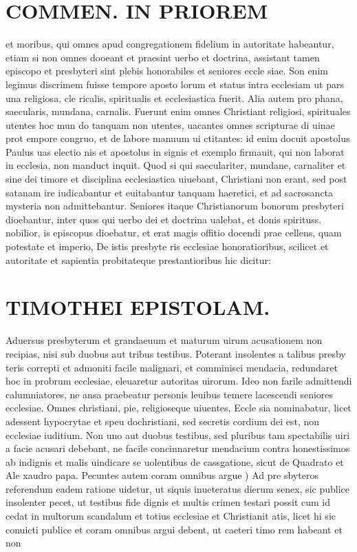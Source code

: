 \documentclass{article}
\begin{document}
\begin{pages}
\section*{COMMEN. IN PRIOREM }
\marginpar{[ p.142 ]}\pstart et moribus, qui omnes apud congregationem fidelium in autoritate habeantur, etiam si non omnes dooeant et praesint uerbo et doctrina, assistant tamen episcopo et presbyteri sint plebis honorabiles et seniores eccle siae. Son enim legimus discrimem fuisse tempore aposto lorum et status intra ecclesiam ut pars una religiosa, cle ricalis, spiritualis et ecclesiastica fuerit. Alia autem pro phana, saecularis, mundana, carnalis. Fuerunt enim omnes Christiant religiosi, spirituales utentes hoc mun do tanquam non utentes, uacantes omnes scripturae di uinae prot empore congruo, et de labore manuum ui ctitantes: id enim docuit apostolus Paulus uas electio nis et apostolus in signis et exemplo firmauit, qui non laborat in ecclesia, non manduct inquit. Quod si qui saeculariter, mundane, carnaliter et sine dei timore et disciplina ecclesiastica uiuebant, Christiani non erant, sed post satanam ire iudicabantur et euitabantur tanquam haeretici, et ad sacrosancta mysteria non admittebantur. Seniores itaque Christianorum bonorum presbyteri dioebantur, inter quos qui uerbo dei et doctrina ualebat, et donis spirituss. nobilior, is episcopus dioebatur, et erat magis offitio docendi prae cellens, quam potestate et imperio, De istis presbyte ris ecclesiae honoratioribus, scilicet et autoritate et sapientia probitateque prestantioribus hic dicitur:  \pend
\section*{TIMOTHEI EPISTOLAM. }
\marginpar{[ p.143 ]}\pstart Aduersus presbyterum et grandaeuum et maturum uirum acusationem non recipias, nisi sub duobus aut tribus testibus. Poterant insolentes a talibus presby teris correpti et admoniti facile malignari, et comminisci mendacia, redundaret hoc in probrum ecclesiae, eleuaretur autoritas uirorum. Ideo non farile admittendi calumniatores, ne ansa praebeatur personis leuibus temere lacescendi seniores ecclesiae.  \pend\pstart Omnes christiani, pie, religioseque uiuentes, Eccle sia nominabatur, licet adessent hypocrytae et speu dochristiani, sed secretis cordium dei est, non ecclesiae iuditium. Non uno aut duobus testibus, sed pluribus tam spectabilis uiri a facie acusari debebant, ne facile concinnaretur mendacium contra honestissimos ab indignis et malis uindicare se uolentibus de cassgatione, sicut de Quadrato et Ale xaudro papa.  \pend\pstart Pecuntes autem coram omnibus argue ) Ad pre sbyteros referendum eadem ratione uidetur, ut siquis inueteratus dierum senex, sic publice insolenter pecet, ut testibus fide dignis et multis crimen testari possit cum id cedat in multorum scandalum et totius ecclesiae et Christianit atis, licet hi sic conuicti publice et coram omnibus argui debent, ut caeteri timo rem habeant et non  \pend

\end{pages}
\end{document}

